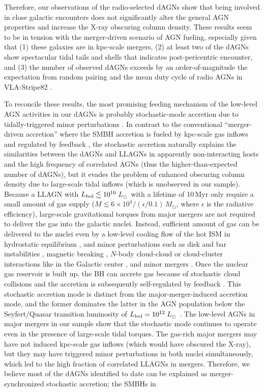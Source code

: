 \documentclass[iop,revtex4,twocolumn,apj,numberedappendix,appendixfloats]{emulateapj}
\newcommand{\msun}{$M_{\odot}$}
\newcommand{\lsun}{$L_{\odot}$}
\begin{document}
Therefore, our observations of the radio-selected dAGNs show that being involved in close galactic encounters does not significantly alter the general AGN properties and increase the X-ray obscuring column density. These results seem to be in tension with the merger-driven scenario of AGN fueling, especially given that (1) these galaxies are in kpc-scale mergers, (2) at least two of the dAGNs show spectacular tidal tails and shells that indicates post-pericentric encounter, and (3) the number of observed dAGNs exceeds by an order-of-magnitude the expectation from random pairing and the mean duty cycle of radio AGNs in VLA-Stripe82 . 

To reconcile these results, the most promising feeding mechanism of the low-level AGN activities in our dAGNs is probably stochastic-mode accretion due to tidally-triggered minor perturbations \citep[e.g.,][]{Hopkins06a}. In contrast to the conventional ``merger-driven accretion'' where the SMBH accretion is fueled by kpc-scale gas inflows and regulated by feedback \citep[e.g.,][]{Di-Matteo05,Hopkins05a}, the stochastic accretion naturally explains the similarities between the dAGNs and LLAGNs in apparently non-interacting hosts and the high frequency of correlated AGNs (thus the higher-than-expected number of dAGNs), but it evades the problem of enhanced obscuring column density due to large-scale tidal inflows (which is unobserved in our sample). Because a LLAGN with $L_{\rm bol} \lesssim 10^{10}$\,\lsun\ with a lifetime of 10\,Myr only require a small amount of gas supply ($M \lesssim 6\times10^4/(\epsilon/0.1)$\,\msun, where $\epsilon$ is the radiative efficiency), large-scale gravitational torques from major mergers are not required to deliver the gas into the galactic nuclei. Instead, sufficient amount of gas can be delivered to the nuclei even by a low-level cooling flow of the hot ISM in hydrostatic equilibrium \citep[e.g.,][]{Allen06}, and minor perturbations such as disk and bar instabilities \citep[e.g.,][]{Norman83,Jogee06}, magnetic breaking \citep[e.g.,][]{Krolik90}, $N$-body cloud-cloud or cloud-cluster interactions like in the Galactic center \citep[e.g.,][]{Genzel94}, and minor mergers \citep[e.g.,][]{Hernquist95}. Once the nuclear gas reservoir is built up, the BH can accrete gas because of stochastic cloud collisions and the accretion is subsequently self-regulated by feedback \citep[e.g.,][]{Yuan11,Bu19} . This stochastic accretion mode is distinct from the major-merger-induced accretion mode, and the former dominates the latter in the AGN population below the Seyfert/Quasar transition luminosity of $L_{\rm bol} = 10^{12}$\,\lsun\ \citep{Hopkins14a}. The low-level AGNs in major mergers in our sample show that the stochastic mode continues to operate even in the presence of large-scale tidal torques. The gas-rich major mergers may have not induced kpc-scale gas inflows (which would have obscured the X-ray), but they may have triggered minor perturbations in both nuclei simultaneously, which led to the high fraction of correlated LLAGNs in mergers. Therefore, we believe most of the dAGNs identified to date can be explained as merger-synchronized stochastic accretion; the SMBHs in 
\end{document}
